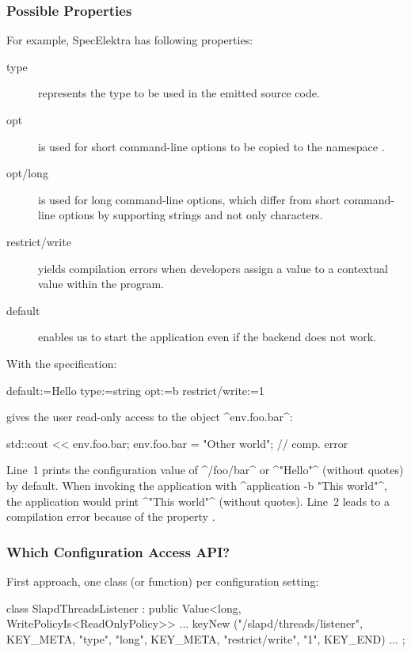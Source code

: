 \begin{frame}
	\frametitle{Possible Properties}
	For example, SpecElektra has following properties:
	\begin{description}
	\item[type] represents the type to be used in the emitted source code.
	\item[opt] is used for short command-line options to be copied to the namespace .
	\item[opt/long] is used for long command-line options, which differ from short command-line options by supporting strings and not only characters.
	\item[restrict/write] yields compilation errors when developers assign a value to a contextual value within the program.
	\item[default] enables us to start the application even if the backend does not work.
	\end{description}
\end{frame}

\begin{frame}[fragile]
	With the specification:
	\par
	\begin{code}
	  default:=Hello
	  type:=string
	  opt:=b
	  restrict/write:=1
	\end{code}
	\par
	 gives the user read-only access to the object ^env.foo.bar^:
	\par
	\begin{code}[language=Cpp]
	std::cout << env.foo.bar;
	env.foo.bar = "Other world"; // comp. error
	\end{code}
	\par
	\small
	\pause
	Line~1 prints the configuration value of ^/foo/bar^ or ^"Hello"^ (without quotes) by default.
	When invoking the application with ^application -b "This world"^, the application would print ^"This world"^ (without quotes).
	Line~2 leads to a compilation error because of the property .
\end{frame}

\begin{frame}[fragile]
	\frametitle{Which Configuration Access API?}

	First approach, one class (or function) per configuration setting:
	\\[1em]
	\begin{code}[gobble=4,language=Cpp]
	class SlapdThreadsListener : public Value<long,
		WritePolicyIs<ReadOnlyPolicy>> {
		... keyNew ("/slapd/threads/listener",
			    KEY_META, "type", "long",
			    KEY_META, "restrict/write", "1",
			    KEY_END) ...
	};
	\end{code}
\end{frame}

